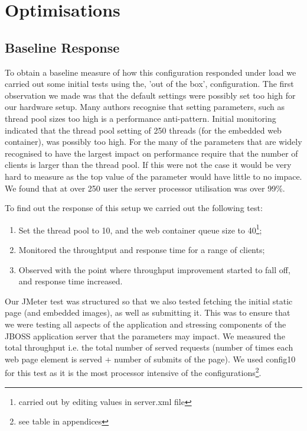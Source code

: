 \section{Optimisations}

\subsection*{Baseline Response}

To obtain a baseline measure of how this configuration responded under load we carried out some initial tests using the, 'out of the box', configuration. The first observation we made was that the default settings were possibly set too high for our hardware setup. Many authors recognise that setting parameters, such as thread pool sizes too high is a performance anti-pattern\cite{performance_solutions}. Initial monitoring indicated that the thread pool setting of 250 threads (for the embedded web container), was possibly too high. For the many of the parameters that are widely recognised to have the largest impact on performance require that the number of clients is larger than the thread pool\cite{model_server_settings_jee}. If this were not the case it would be very hard to measure as the top value of the parameter would have little to no impace. We found that at over 250 user the server processor utilisation was over 99\%. 

To find out the response of this setup we carried out the following test:
\begin{enumerate}
 \item Set the thread pool to 10, and the web container queue size to 40\footnote{carried out by editing values in server.xml file};
 \item Monitored the throughtput and response time for a range of clients;
 \item Observed with the point where throughput improvement started to fall off, and response time increased.
\end{enumerate}

Our JMeter test was structured so that we also tested fetching the initial static page (and embedded images), as well as submitting it. This was to ensure that we were testing all aspects of the application and stressing components of the JBOSS application server that the parameters may impact. We measured the total throughput i.e. the total number of served requests (number of times each web page element is served + number of submits of the page). We used config10 for this test as it is the most processor intensive of the configurations\footnote{see table in appendices}.
\newline

